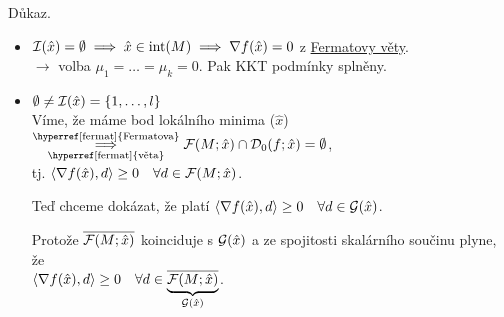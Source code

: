 Důkaz.

\begin{itemize}
    \item $\mathcal{I}(\hat x) = \emptyset \implies \hat x \in \operatorname*{int}(M) \implies \nabla f(\hat x) = 0$ z 
    \hyperref[fermat]{Fermatovy věty}. \\
    $\rightarrow$ volba $\mu_1 = \dots = \mu_k = 0$. Pak KKT podmínky splněny.
    \item $\emptyset \not= \mathcal{I}(\hat x) = \left\lbrace 1, \dots, l \right\rbrace$\\
    Víme, že máme bod lokálního minima ($\hat x$) $\underset{\text{\hyperref[fermat]{věta}}}
    {\overset{\text{\hyperref[fermat]{Fermatova}}}{\implies}} \F(M; \hat x) \cap \D_0(f; \hat x) = \emptyset$, \\
    tj. $\langle \nabla f(\hat x), d\rangle \geq 0 \quad \forall d \in \mathcal{F}(M; \hat x)$. 

    Teď chceme dokázat, že platí $\langle \nabla f(\hat x), d\rangle \geq 0 \quad \forall d \in \mathcal{G}(\hat x)$. 

    Protože $\overline{\mathcal{F}(M; \hat x)}$ koinciduje s $\mathcal{G}(\hat x)$ a ze spojitosti skalárního součinu plyne, že \\ 
    $\langle \nabla f(\hat x), d\rangle \geq 0 \quad \forall d \in \underbrace{\overline{\mathcal{F}(M; \hat x)}}_{\mathcal{G}(\hat x)}$.


\end{itemize}
